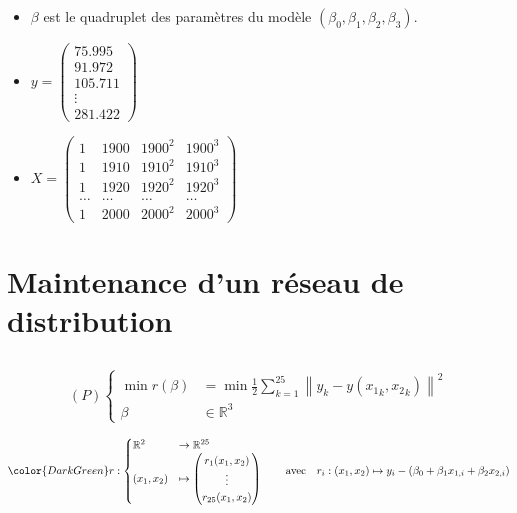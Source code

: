 \documentclass{article}
\newcommand{\R}{\mathbb{R}}
\newcommand{\cor}[1]{{\color{DarkGreen} #1}}
\begin{document}
\begin{itemize}
	\item $\beta$ est le quadruplet des paramètres du modèle $(\beta_0, \beta_1, \beta_2, \beta_3)$.
	\item $y = \begin{pmatrix} 75.995 \\ 91.972 \\ 105.711 \\ \vdots \\ 281.422 \end{pmatrix}$
	\item $X = \begin{pmatrix} 1 & 1900 & 1900^2 & 1900^3 \\ 1 & 1910 & 1910^2 & 1910^3 \\ 1&1920&1920^2 & 1920^3 \\ \ldots & \ldots & \ldots & \ldots \\ 1 & 2000 & 2000^2 & 2000^3 \end{pmatrix} $
\end{itemize}

\section{Maintenance d'un réseau de distribution}

\subsection{}

\[
	(P) \begin{cases}
		\min r(\beta) &= \min \frac{1}{2} \sum_{k=1}^{25} \left\| y_k - y({x_1}_k, {x_2}_k) \right\|^2 \\
		\beta &\in \mathbb{R}^3
	\end{cases}
\] 

\[
	\cor{
		r: \begin{cases}
			\R^2 &\to \R^{25} \\
			(x_1, x_2) &\mapsto \begin{pmatrix} r_1(x_1, x_2) \\ \vdots \\ r_{25}(x_1, x_2) \end{pmatrix} 
		\end{cases}
		\qquad \text{avec} \quad r_i: (x_1, x_2) \mapsto y_i - (\beta_0 + \beta_1 x_{1, i} + \beta_2 x_{2, i})
	}
\] 

\subsection{}
\end{document}
